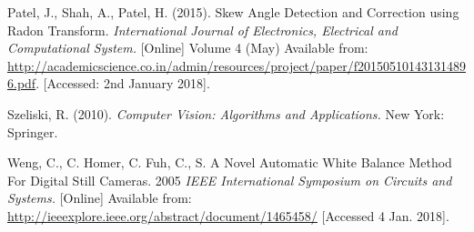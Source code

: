 \documentclass[a4paper, 12pt]{article}
\begin{document}
Patel, J., Shah, A., Patel, H. (2015). Skew Angle Detection and Correction using Radon Transform. \textit{International Journal of Electronics, Electrical and Computational System.} [Online] Volume 4 (May) Available from: \url{http://academicscience.co.in/admin/resources/project/paper/f201505101431314896.pdf}. [Accessed: 2nd January 2018].

Szeliski, R. (2010). \textit{Computer Vision: Algorithms and Applications.} New York: Springer.

Weng, C., C. Homer, C. Fuh, C., S. A Novel Automatic White Balance Method For Digital Still Cameras. 2005 \textit{IEEE International Symposium on Circuits and Systems.} [Online] Available from: \url{http://ieeexplore.ieee.org/abstract/document/1465458/} [Accessed 4 Jan. 2018].
\end{document}
